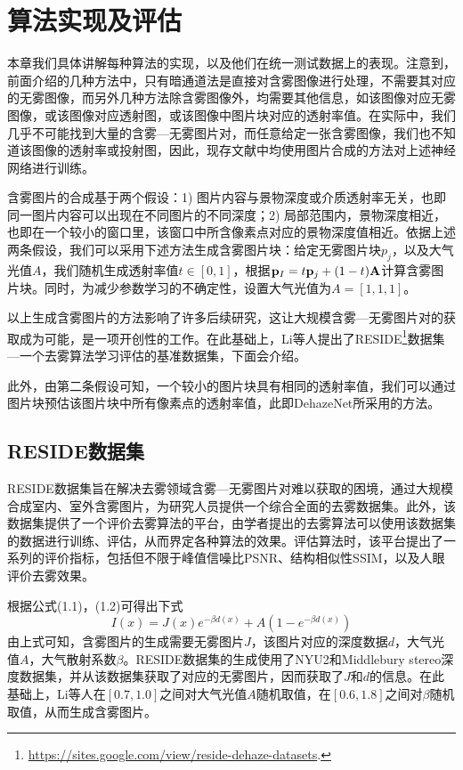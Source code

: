 \documentclass[a4paper, 12pt, oneside]{report}
\begin{document}
{\chapter{算法实现及评估\quad}

本章我们具体讲解每种算法的实现，以及他们在统一测试数据上的表现。注意到，前面介绍的几种方法中，只有暗通道法是直接对含雾图像进行处理，不需要其对应的无雾图像，而另外几种方法除含雾图像外，均需要其他信息，如该图像对应无雾图像，或该图像对应透射图，或该图像中图片块对应的透射率值。在实际中，我们几乎不可能找到大量的含雾—无雾图片对，而任意给定一张含雾图像，我们也不知道该图像的透射率或投射图，因此，现存文献中均使用图片合成的方法对上述神经网络进行训练。

含雾图片的合成基于两个假设\cite{ref20}：1) 图片内容与景物深度或介质透射率无关，也即同一图片内容可以出现在不同图片的不同深度；2) 局部范围内，景物深度相近，也即在一个较小的窗口里，该窗口中所含像素点对应的景物深度值相近。依据上述两条假设，我们可以采用下述方法生成含雾图片块：给定无雾图片块$p_j$，以及大气光值$A$，我们随机生成透射率值$t\in [0,1]$，根据${\bf p}_I = t{\bf p}_j + (1 - t){\bf A}$计算含雾图片块。同时，为减少参数学习的不确定性，设置大气光值为$A = [1,1,1]$。

以上生成含雾图片的方法影响了许多后续研究，这让大规模含雾—无雾图片对的获取成为可能，是一项开创性的工作。在此基础上，Li\cite{ref21}等人提出了RESIDE\footnote{\url{https://sites.google.com/view/reside-dehaze-datasets}.}数据集—一个去雾算法学习评估的基准数据集，下面会介绍。

此外，由第二条假设可知，一个较小的图片块具有相同的透射率值，我们可以通过图片块预估该图片块中所有像素点的透射率值，此即DehazeNet所采用的方法。

\section{RESIDE数据集\quad}
RESIDE数据集旨在解决去雾领域含雾—无雾图片对难以获取的困境，通过大规模合成室内、室外含雾图片，为研究人员提供一个综合全面的去雾数据集。此外，该数据集提供了一个评价去雾算法的平台，由学者提出的去雾算法可以使用该数据集的数据进行训练、评估，从而界定各种算法的效果。评估算法时，该平台提出了一系列的评价指标，包括但不限于峰值信噪比PSNR、结构相似性SSIM，以及人眼评价去雾效果。

根据公式(1.1)，(1.2)可得出下式
\begin{equation}
I(x) = J(x) e^{-\beta d(x)} + A(1 - e^{-\beta d(x)})
\end{equation}
由上式可知，含雾图片的生成需要无雾图片$J$，该图片对应的深度数据$d$，大气光值$A$，大气散射系数$\beta$。RESIDE数据集的生成使用了NYU2\cite{ref22}和Middlebury stereo\cite{ref23}深度数据集，并从该数据集获取了对应的无雾图片，因而获取了$J$和$d$的信息。在此基础上，Li等人在$[0.7, 1.0]$之间对大气光值$A$随机取值，在$[0.6, 1.8]$之间对$\beta$随机取值，从而生成含雾图片。

}
\end{document}
